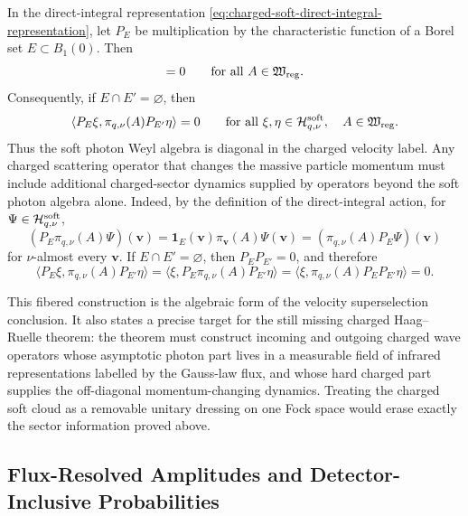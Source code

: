 \begin{remark}
\label{rem:soft-weyl-algebra-preserves-velocity-fibers}
In the direct-integral representation
\eqref{eq:charged-soft-direct-integral-representation}, let
\(P_E\) be multiplication by the characteristic function of a Borel set
\(E\subset B_1(0)\).  Then
\begin{equation}
  [P_E,\pi_{q,\nu}(A)]=0
  \qquad
  \text{for all }A\in\mathfrak W_{\rm reg}.
  \label{eq:velocity-projection-commutes-soft-algebra}
\end{equation}
Consequently, if \(E\cap E'=\varnothing\), then
\begin{equation}
  \langle P_E\xi,\pi_{q,\nu}(A)P_{E'}\eta\rangle=0
  \qquad
  \text{for all }\xi,\eta\in\mathcal H_{q,\nu}^{\rm soft},
  \quad A\in\mathfrak W_{\rm reg}.
  \label{eq:soft-algebra-no-velocity-transition}
\end{equation}
Thus the soft photon Weyl algebra is diagonal in the charged velocity label.
Any charged scattering operator that changes the massive particle momentum
must include additional charged-sector dynamics supplied by operators beyond
the soft photon algebra alone.
Indeed, by the definition of the direct-integral action, for
\(\Psi\in\mathcal H_{q,\nu}^{\rm soft}\),
\[
  (P_E\pi_{q,\nu}(A)\Psi)(\mathbf v)
  =
  \mathbf 1_E(\mathbf v)\pi_{\mathbf v}(A)\Psi(\mathbf v)
  =
  (\pi_{q,\nu}(A)P_E\Psi)(\mathbf v)
\]
for \(\nu\)-almost every \(\mathbf v\).  If \(E\cap E'=\varnothing\), then
\(P_EP_{E'}=0\), and therefore
\[
  \langle P_E\xi,\pi_{q,\nu}(A)P_{E'}\eta\rangle
  =
  \langle \xi,P_E\pi_{q,\nu}(A)P_{E'}\eta\rangle
  =
  \langle \xi,\pi_{q,\nu}(A)P_EP_{E'}\eta\rangle
  =
  0 .
  \]
\end{remark}

This fibered construction is the algebraic form of the velocity
superselection conclusion.  It also states a precise target for the still
missing charged Haag--Ruelle theorem: the theorem must construct incoming and
outgoing charged wave operators whose asymptotic photon part lives in a
measurable field of infrared representations labelled by the Gauss-law flux,
and whose hard charged part supplies the off-diagonal momentum-changing
dynamics.  Treating the charged soft cloud as a removable unitary dressing on
one Fock space would erase exactly the sector information proved above.

\subsection{Flux-Resolved Amplitudes and Detector-Inclusive Probabilities}

